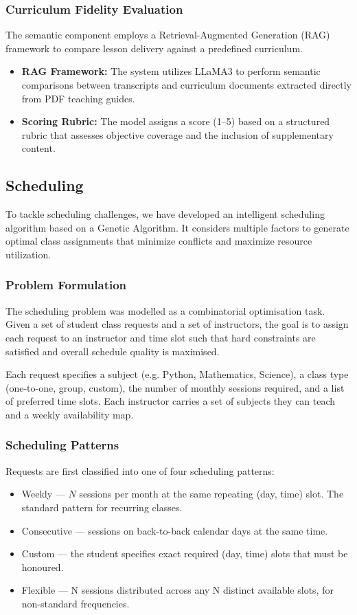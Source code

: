 \subsubsection{Curriculum Fidelity Evaluation}
The semantic component employs a Retrieval-Augmented Generation (RAG) framework to compare lesson delivery against a predefined curriculum.
\begin{itemize}
    \item \textbf{RAG Framework:} The system utilizes LLaMA3 to perform semantic comparisons between transcripts and curriculum documents extracted directly from PDF teaching guides.
    \item \textbf{Scoring Rubric:} The model assigns a score (1–5) based on a structured rubric that assesses objective coverage and the inclusion of supplementary content.
\end{itemize}

\subsection{Scheduling}

To tackle scheduling challenges, we have developed an intelligent scheduling algorithm based on a Genetic Algorithm. It considers multiple factors to generate optimal class assignments that minimize conflicts and maximize resource utilization.

\subsubsection{Problem Formulation}
  The scheduling problem was modelled as a combinatorial optimisation task. 
  Given a set of student class requests and a set of instructors, the goal  
  is to assign each request to an instructor and time slot such that hard   
  constraints are satisfied and overall schedule quality is maximised.      
                                                     
  Each request specifies a subject (e.g. Python, Mathematics, Science), a class  
  type (one-to-one, group, custom), the number of monthly sessions
  required, and a list of preferred time slots. Each instructor carries a set of subjects they can teach and a weekly availability map.

\subsubsection{Scheduling Patterns}
  Requests are first classified into one of four scheduling patterns:       
  \begin{itemize}
    \item Weekly — $N$ sessions per month at the same repeating (day, time) slot. The standard pattern for recurring classes.
    \item Consecutive — sessions on back-to-back calendar days at the same time.  
    \item Custom — the student specifies exact required (day, time) slots that must be honoured.   
    \item Flexible — N sessions distributed across any N distinct available slots, for non-standard frequencies.     
  \end{itemize}

